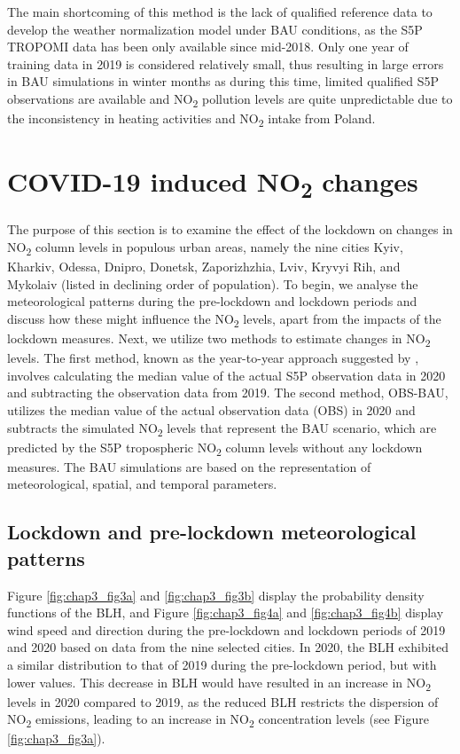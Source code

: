 The main shortcoming of this method is the lack of qualified reference data to develop the weather normalization model under BAU conditions, as the S5P TROPOMI data has been only available since mid-2018. Only one year of training data in 2019 is considered relatively small, thus resulting in large errors in BAU simulations in winter months as during this time, limited qualified S5P observations are available and NO\textsubscript{2} pollution levels are quite unpredictable due to the inconsistency in heating activities and NO\textsubscript{2} intake from Poland.\par
\section{COVID-19 induced NO\textsubscript{2} changes} \label{chap3_covid}
The purpose of this section is to examine the effect of the lockdown on changes in NO\textsubscript{2} column levels in populous urban areas, namely the nine cities Kyiv, Kharkiv, Odessa, Dnipro, Donetsk, Zaporizhzhia, Lviv, Kryvyi Rih, and Mykolaiv (listed in declining order of population). To begin, we analyse the meteorological patterns during the pre-lockdown and lockdown periods and discuss how these might influence the NO\textsubscript{2} levels, apart from the impacts of the lockdown measures. Next, we utilize two methods to estimate changes in NO\textsubscript{2} levels. The first method, known as the year-to-year approach suggested by \citep{barre2021estimating}, involves calculating the median value of the actual S5P observation data in 2020 and subtracting the observation data from 2019. The second method, OBS-BAU, utilizes the median value of the actual observation data (OBS) in 2020 and subtracts the simulated NO\textsubscript{2} levels that represent the BAU scenario, which are predicted by the S5P tropospheric NO\textsubscript{2} column levels without any lockdown measures. The BAU simulations are based on the representation of meteorological, spatial, and temporal parameters. \par
\subsection{Lockdown and pre-lockdown meteorological patterns}
Figure \ref{fig:chap3_fig3a} and \ref{fig:chap3_fig3b} display the probability density functions of the BLH, and Figure \ref{fig:chap3_fig4a} and \ref{fig:chap3_fig4b} display wind speed and direction during the pre-lockdown and lockdown periods of 2019 and 2020 based on data from the nine selected cities. In 2020, the BLH exhibited a similar distribution to that of 2019 during the pre-lockdown period, but with lower values. This decrease in BLH would have resulted in an increase in NO\textsubscript{2} levels in 2020 compared to 2019, as the reduced BLH restricts the dispersion of NO\textsubscript{2} emissions, leading to an increase in NO\textsubscript{2} concentration levels (see Figure \ref{fig:chap3_fig3a}). \par


